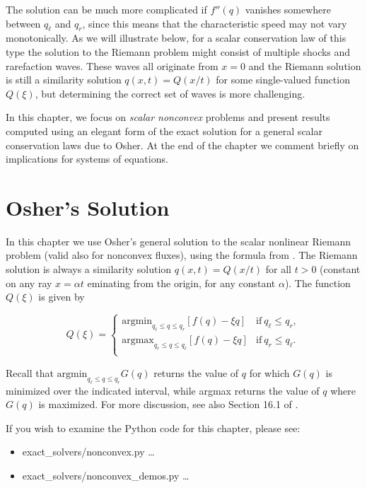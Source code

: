 \documentclass{SIAMbook2016}
\providecommand{\tightlist}{%
      \setlength{\itemsep}{0pt}\setlength{\parskip}{0pt}}
\begin{document}
The solution can be much more complicated if \(f''(q)\) vanishes
somewhere between \(q_\ell\) and \(q_r\), since this means that the
characteristic speed may not vary monotonically. As we will illustrate
below, for a scalar conservation law of this type the solution to the
Riemann problem might consist of multiple shocks and rarefaction waves.
These waves all originate from \(x=0\) and the Riemann solution is still
a similarity solution \(q(x,t) = Q(x/t)\) for some single-valued
function \(Q(\xi)\), but determining the correct set of waves is more
challenging.

In this chapter, we focus on \emph{scalar nonconvex} problems and
present results computed using an elegant form of the exact solution for
a general scalar conservation laws due to Osher. At the end of the
chapter we comment briefly on implications for systems of equations.

\hypertarget{oshers-solution}{%
\section{Osher's Solution}\label{oshers-solution}}

In this chapter we use Osher's general solution to the scalar nonlinear
Riemann problem (valid also for nonconvex fluxes), using the formula
from \cite{osher1984}. The Riemann solution is always a similarity
solution \(q(x,t) = Q(x/t)\) for all \(t>0\) (constant on any ray
\(x=\alpha t\) eminating from the origin, for any constant \(\alpha\)).
The function \(Q(\xi)\) is given by

\[
Q(\xi) = \begin{cases} 
    \text{argmin}_{q_\ell \leq q \leq q_r} [f(q) - \xi q]& \text{if} ~q_\ell\leq q_r,\\
    \text{argmax}_{q_r \leq q \leq q_\ell} [f(q) - \xi q]& \text{if} ~q_r\leq q_\ell.\\
\end{cases}
\]

Recall that \(\text{argmin}_{q_\ell \leq q \leq q_r} G(q)\) returns the
value of \(q\) for which \(G(q)\) is minimized over the indicated
interval, while argmax returns the value of \(q\) where \(G(q)\) is
maximized. For more discussion, see also Section 16.1 of \cite{fvmhp}.

If you wish to examine the Python code for this chapter, please see:

\begin{itemize}
\tightlist
\item
  {exact\_solvers/nonconvex.py} \ldots{}
\item
  {exact\_solvers/nonconvex\_demos.py} \ldots{}
\end{itemize}
\end{document}
